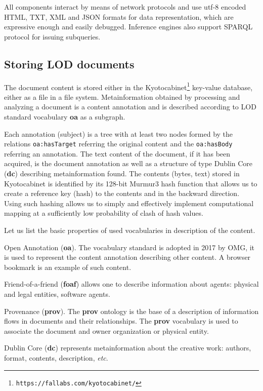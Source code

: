 \documentclass[conference,a4paper]{IEEEtran}
\providecommand\url[1]{\texttt{#1}}
\begin{document}
All components interact by means of network protocols and use utf-8 encoded HTML, TXT, XML and JSON formats for data representation, which are expressive enough and easily debugged.  Inference engines also support SPARQL protocol for issuing subqueries.

\subsection{Storing LOD documents}

The document content is stored either in the Kyotocabinet\footnote{\url{https://fallabs.com/kyotocabinet/}} key-value database, either as a file in a file system.  Metainformation obtained by processing and analyzing a document is a content annotation and is described according to LOD standard vocabulary \textbf{oa} as a subgraph.

Each annotation (subject) is a tree with at least two nodes formed by the relations \texttt{oa:hasTarget} referring the original content and the \texttt{oa:hasBody} referring an annotation.  The text content of the document, if it has been acquired, is the document annotation as well as a structure of type Dublin Core (\textbf{dc}) describing metainformation found.  The contents (bytes, text) stored in Kyotocabinet is identified by its 128-bit Murmur3 hash function that allows us to create a reference key (hash) to the contents and in the backward direction.  Using such hashing allows us to simply and effectively implement computational mapping at a sufficiently low probability of clash of hash values.

Let us list the basic properties of used vocabularies in description of the content.

Open Annotation (\textbf{oa}). The vocabulary standard is adopted in 2017 by OMG, it is used to represent the content annotation describing other content.  A browser bookmark is an example of such content.

Friend-of-a-friend (\textbf{foaf}) allows one to describe information about agents: physical and legal entities, software agents.

Provenance (\textbf{prov}).  The \textbf{prov} ontology is the base of a description of information flows in documents and their relationships. The \textbf{prov} vocabulary is used to associate the document and owner organization or physical entity.

Dublin Core (\textbf{dc}) represents metainformation about the creative work: authors, format, contents, description, \emph{etc}.
\end{document}
